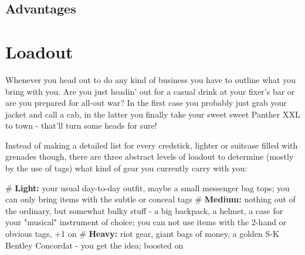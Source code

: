 \subsection{Advantages}



\section{Loadout}

Whenever you head out to do any kind of business you have to outline what you bring with you. Are you just headin' out for a casual drink at your fixer's bar or are you prepared for all-out war? In the first case you probably just grab your jacket and call a cab, in the latter you finally take your sweet sweet Panther XXL to town - that'll turn some heads for sure!

Instead of making a detailed list for every credstick, lighter or suitcase filled with grenades though, there are three abstract levels of loadout to determine (mostly by the use of \refname{tags}) what kind of gear you currently carry with you:

\begin{easylist}
    # \textbf{Light:} your usual day-to-day outfit, maybe a small messenger bag tops; you can only bring items with the \textsf{subtle} or \textsf{conceal} tags
    # \textbf{Medium:} nothing out of the ordinary, but somewhat bulky stuff - a big backpack, a helmet, a case for your "musical" instrument of choice; you can not use items with the \textsf{2-hand} or \textsf{obvious} tags, +1 on 
    # \textbf{Heavy:} riot gear, giant bags of money, a golden S-K Bentley Concordat - you get the idea; boosted on 
\end{easylist}
